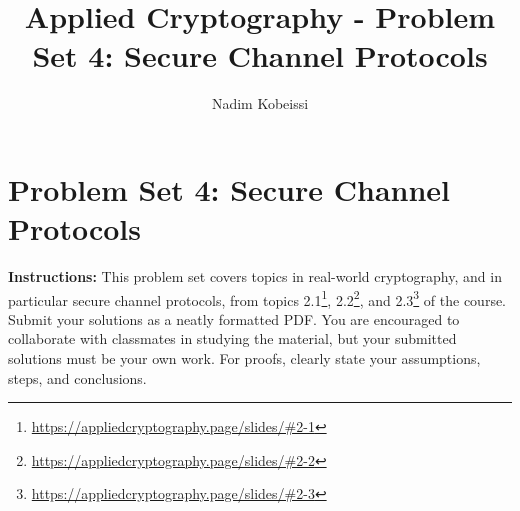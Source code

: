 \documentclass[10pt,a4paper,american]{exam}
\title{Applied Cryptography - Problem Set 4: Secure Channel Protocols}
\author{Nadim Kobeissi}
\begin{document}
\classhandoutheader
\section*{Problem Set 4: Secure Channel Protocols}

\begin{tcolorbox}[colframe=OliveGreen!30!white,colback=OliveGreen!5!white]
	\textbf{Instructions:} This problem set covers topics in real-world cryptography, and in particular secure channel protocols, from topics 2.1\footnote{\url{https://appliedcryptography.page/slides/\#2-1}}, 2.2\footnote{\url{https://appliedcryptography.page/slides/\#2-2}}, and 2.3\footnote{\url{https://appliedcryptography.page/slides/\#2-3}} of the course. Submit your solutions as a neatly formatted PDF. You are encouraged to collaborate with classmates in studying the material, but your submitted solutions must be your own work. For proofs, clearly state your assumptions, steps, and conclusions.
\end{tcolorbox}
\end{document}
